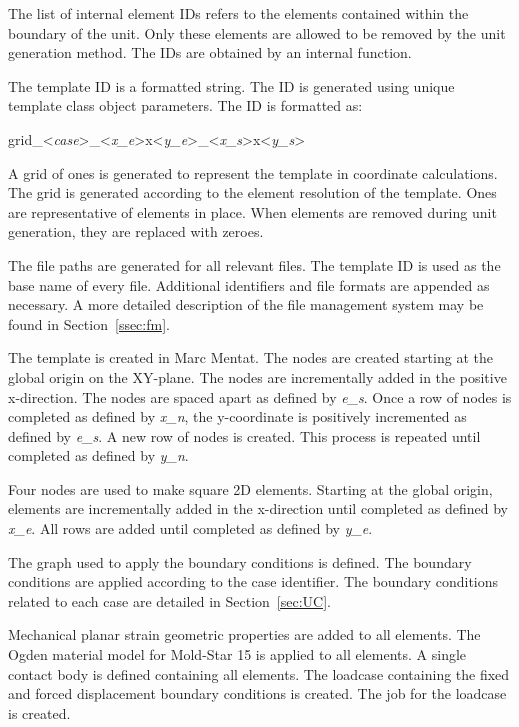 The list of internal element IDs refers to the elements contained within the boundary of the unit. Only these elements are allowed to be removed by the unit generation method. The IDs are obtained by an internal function.

The template ID is a formatted string. The ID is generated using unique template class object parameters. The ID is formatted as:

\vspace{\baselineskip}

\centerline{grid\_<\textit{case}>\_<\textit{x\_e}>x<\textit{y\_e}>\_<\textit{x\_s}>x<\textit{y\_s}>}

\vspace{\baselineskip}

A grid of ones is generated to represent the template in coordinate calculations. The grid is generated according to the element resolution of the template. Ones are representative of elements in place. When elements are removed during unit generation, they are replaced with zeroes.

The file paths are generated for all relevant files. The template ID is used as the base name of every file. Additional identifiers and file formats are appended as necessary. A more detailed description of the file management system may be found in Section~\ref{ssec:fm}.

The template is created in Marc Mentat. The nodes are created starting at the global origin on the XY-plane. The nodes are incrementally added in the positive x-direction. The nodes are spaced apart as defined by \textit{e\_s}. Once a row of nodes is completed as defined by \textit{x\_n}, the y-coordinate is positively incremented as defined by \textit{e\_s}. A new row of nodes is created. This process is repeated until completed as defined by \textit{y\_n}.

Four nodes are used to make square 2D elements. Starting at the global origin, elements are incrementally added in the x-direction until completed as defined by \textit{x\_e}. All rows are added until completed as defined by \textit{y\_e}.

The graph used to apply the boundary conditions is defined. The boundary conditions are applied according to the case identifier. The boundary conditions related to each case are detailed in Section~\ref{sec:UC}.

Mechanical planar strain geometric properties are added to all elements. The Ogden material model for Mold-Star 15 is applied to all elements. A single contact body is defined containing all elements. The loadcase containing the fixed and forced displacement boundary conditions is created. The job for the loadcase is created.


